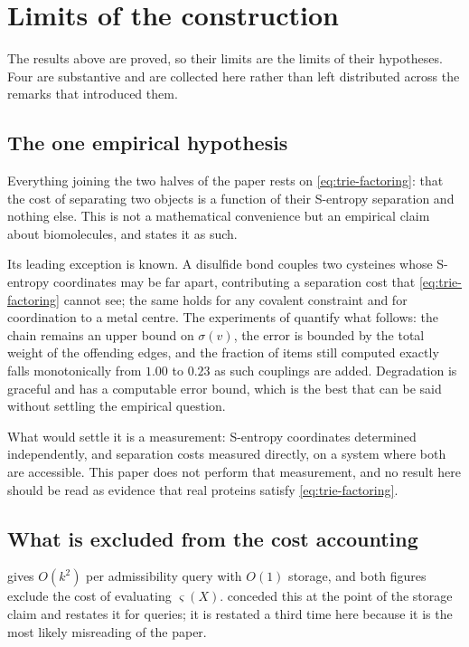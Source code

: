\documentclass[11pt,twocolumn,a4paper]{article}
\theoremstyle{thmstyle}
\theoremstyle{definition}
\theoremstyle{remark}
\newcommand{\str}{\sigma}
\newcommand{\sse}{\varsigma}
\begin{document}
\section{Limits of the construction}
\label{sec:limits}

The results above are proved, so their limits are the limits of their
hypotheses. Four are substantive and are collected here rather than
left distributed across the remarks that introduced them.

\subsection{The one empirical hypothesis}

Everything joining the two halves of the paper rests on
\eqref{eq:trie-factoring}: that the cost of separating two objects is a
function of their S-entropy separation and nothing else. This is not a
mathematical convenience but an empirical claim about biomolecules, and
 states it as such.

Its leading exception is known. A disulfide bond couples two cysteines
whose S-entropy coordinates may be far apart, contributing a separation
cost that \eqref{eq:trie-factoring} cannot see; the same holds for any
covalent constraint and for coordination to a metal centre. The
experiments of  quantify what follows: the chain
remains an upper bound on $\str(v)$, the error is bounded by the total
weight of the offending edges, and the fraction of items still computed
exactly falls monotonically from $1.00$ to $0.23$ as such couplings are
added. Degradation is graceful and has a computable error bound, which
is the best that can be said without settling the empirical question.

What would settle it is a measurement: S-entropy coordinates determined
independently, and separation costs measured directly, on a system
where both are accessible. This paper does not perform that
measurement, and no result here should be read as evidence that real
proteins satisfy \eqref{eq:trie-factoring}.

\subsection{What is excluded from the cost accounting}

 gives $O(k^2)$ per admissibility query with $O(1)$
storage, and both figures exclude the cost of evaluating $\sse(X)$.
 conceded this at the point of the storage claim
and  restates it for queries; it is
restated a third time here because it is the most likely
misreading of the paper.
\end{document}
